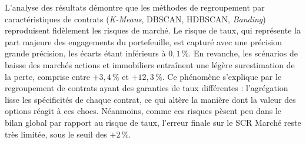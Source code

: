 \begin{table}[H]
    \centering
    \renewcommand{\arraystretch}{1.4}
    \caption{Décomposition de l'erreur sur le module Risque de Marché : forte précision globale sur le risque de taux pour les approches statiques.}
    \label{tab:resultats_central_marche}
\end{table}

L'analyse des résultats démontre que les méthodes de regroupement par caractéristiques de contrats (\textit{K-Means}, DBSCAN, HDBSCAN, \textit{Banding}) reproduisent fidèlement les risques de marché. Le risque de taux, qui représente la part majeure des engagements du portefeuille, est capturé avec une précision grande précision, les écarts étant inférieurs à $0{,}1\,\%$. En revanche, les scénarios de baisse des marchés actions et immobiliers entraînent une légère surestimation de la perte, comprise entre $+3{,}4\,\%$ et $+12{,}3\,\%$. Ce phénomène s'explique par le regroupement de contrats ayant des garanties de taux différentes : l'agrégation lisse les spécificités de chaque contrat, ce qui altère la manière dont la valeur des options réagit à ces chocs. Néanmoins, comme ces risques pèsent peu dans le bilan global par rapport au risque de taux, l'erreur finale sur le SCR Marché reste très limitée, sous le seuil des $+2\,\%$.


